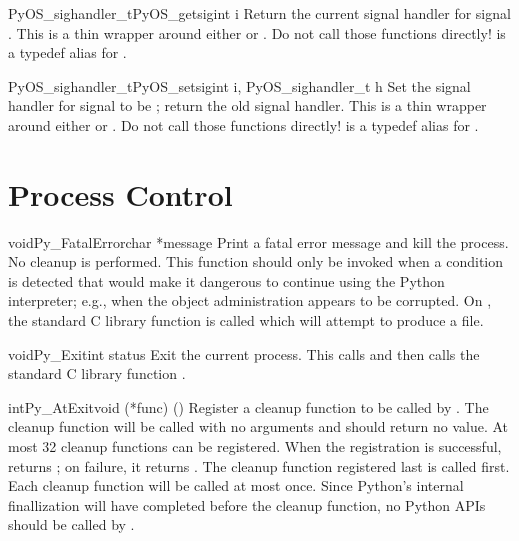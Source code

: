 \documentclass{manual}
\begin{document}
\begin{cfuncdesc}{PyOS_sighandler_t}{PyOS_getsig}{int i}
Return the current signal handler for signal .
This is a thin wrapper around either  or
.  Do not call those functions directly!
 is a typedef alias for .
\end{cfuncdesc}

\begin{cfuncdesc}{PyOS_sighandler_t}{PyOS_setsig}{int i, PyOS_sighandler_t h}
Set the signal handler for signal  to be ;
return the old signal handler.
This is a thin wrapper around either  or
.  Do not call those functions directly!
 is a typedef alias for .
\end{cfuncdesc}


\section{Process Control \label{processControl}}

\begin{cfuncdesc}{void}{Py_FatalError}{char *message}
Print a fatal error message and kill the process.  No cleanup is
performed.  This function should only be invoked when a condition is
detected that would make it dangerous to continue using the Python
interpreter; e.g., when the object administration appears to be
corrupted.  On \UNIX{}, the standard C library function
 is called which will attempt to
produce a  file.
\end{cfuncdesc}

\begin{cfuncdesc}{void}{Py_Exit}{int status}
Exit the current process.  This calls
 and
then calls the standard C library function
.
\end{cfuncdesc}

\begin{cfuncdesc}{int}{Py_AtExit}{void (*func) ()}
Register a cleanup function to be called by
.
The cleanup function will be called with no arguments and should
return no value.  At most 32 cleanup
functions can be registered.
When the registration is successful,  returns
; on failure, it returns .  The cleanup function
registered last is called first.  Each cleanup function will be called
at most once.  Since Python's internal finallization will have
completed before the cleanup function, no Python APIs should be called
by .
\end{cfuncdesc}
\end{document}
